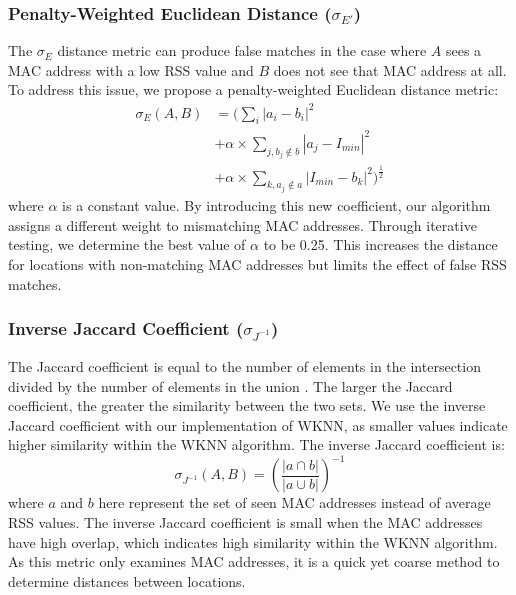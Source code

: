 \documentclass[conference]{IEEEtran}
\begin{document}
\subsubsection{Penalty-Weighted Euclidean Distance ($\sigma_{E'}$)}
\indent The $\sigma_E$ distance metric can produce false matches in the case where $A$ sees a MAC address with a low RSS value and $B$ does not see that MAC address at all. To address this issue, we propose a penalty-weighted Euclidean distance metric:
\begin{equation} \label{eq:penalty_weighted_euclidean}
\begin{split}
\sigma_{E}(A, B) & = (\sum\limits_{i}|a_i-b_i|^2 \\
			& +  \alpha\times\sum\limits_{j, b_j\notin b}|a_j-I_{min}|^2 \\
			& + \alpha\times\sum\limits_{k, a_j\notin a}|I_{min}-b_k|^2)^\frac{1}{2}
\end{split}
\end{equation}
where $\alpha$ is a constant value. By introducing this new coefficient, our algorithm assigns a different weight to mismatching MAC addresses.  Through iterative testing, we determine the best value of $\alpha$ to be 0.25. This increases the distance for locations with non-matching MAC addresses but limits the effect of false RSS matches.
	
\subsubsection{Inverse Jaccard Coefficient ($\sigma_{J^{-1}}$)}
\indent The Jaccard coefficient is equal to the number of elements in the intersection divided by the number of elements in the union \cite{Dunbar}. The larger the Jaccard coefficient, the greater the similarity between the two sets. We use the inverse Jaccard coefficient with our implementation of WKNN, as smaller values indicate higher similarity within the WKNN algorithm. The inverse Jaccard coefficient is: 
\begin{equation}
\label{eq:jaccard}
\sigma_{J^{-1}}(A, B) = \left(\frac{|a\cap b|}{|a\cup b|}\right)^{-1}
\end{equation}
where $a$ and $b$ here represent the set of seen MAC addresses instead of average RSS values. The inverse Jaccard coefficient is small when the MAC addresses have high overlap, which indicates high similarity within the WKNN algorithm. As this metric only examines MAC addresses, it is a quick yet coarse method to determine distances between locations.
\end{document}
